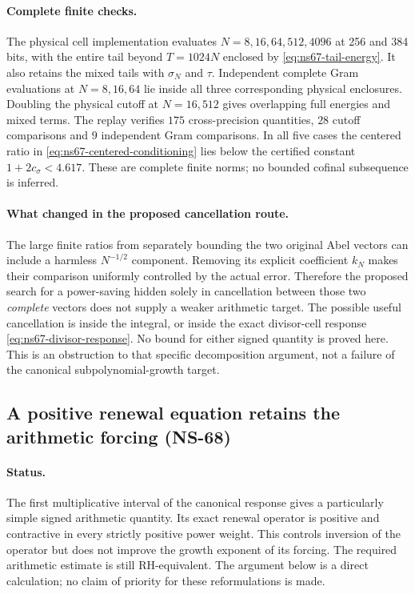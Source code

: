 \documentclass[11pt]{article}
\theoremstyle{remark}
\begin{document}
\paragraph{Complete finite checks.}
The physical cell implementation evaluates $N=8,16,64,512,4096$ at
256 and 384 bits, with the entire tail beyond $T=1024N$ enclosed by
\eqref{eq:ns67-tail-energy}. It also retains the mixed tails with
$\sigma_N$ and $\tau$. Independent complete Gram evaluations at
$N=8,16,64$ lie inside all three corresponding physical enclosures.
Doubling the physical cutoff at $N=16,512$ gives overlapping full
energies and mixed terms. The replay verifies $175$ cross-precision
quantities, $28$ cutoff comparisons and $9$ independent Gram comparisons.
In all five cases the centered ratio in
\eqref{eq:ns67-centered-conditioning} lies below the certified
constant $1+2c_\sigma<4.617$. These are complete finite norms;
no bounded cofinal subsequence is inferred.

\paragraph{What changed in the proposed cancellation route.}
The large finite ratios from separately bounding the two original Abel
vectors can include a harmless $N^{-1/2}$ component. Removing its explicit
coefficient $k_N$ makes their comparison uniformly controlled by the
actual error. Therefore the proposed search for a power-saving hidden
solely in cancellation between those two \emph{complete} vectors does
not supply a weaker arithmetic target. The possible useful cancellation
is inside the integral, or inside the exact divisor-cell response
\eqref{eq:ns67-divisor-response}. No bound for either signed quantity
is proved here. This is an obstruction to that specific decomposition
argument, not a failure of the canonical subpolynomial-growth target.

\subsection{A positive renewal equation retains the arithmetic forcing (NS-68)}
\label{sec:ns68-renewal}

\paragraph{Status.}
The first multiplicative interval of the canonical response gives a
particularly simple signed arithmetic quantity. Its exact renewal
operator is positive and contractive in every strictly positive power
weight. This controls inversion of the operator but does not improve
the growth exponent of its forcing. The required arithmetic estimate
is still RH-equivalent. The argument below is a direct calculation;
no claim of priority for these reformulations is made.
\end{document}
